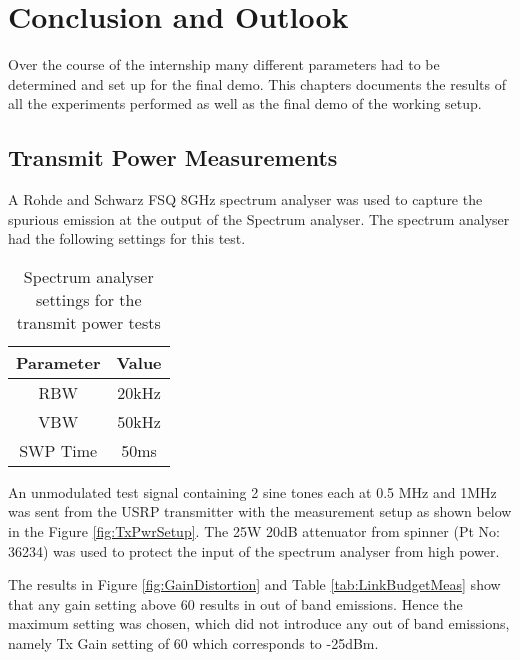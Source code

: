 \chapter{Conclusion and Outlook}
\label{ch:conOutlook}

Over the course of the internship many different parameters had to be determined and set up for the final demo. This chapters documents the results of all the experiments performed as well as the final demo of the working setup.

\section{Transmit Power Measurements}\label{GainDistortion}

A Rohde and Schwarz FSQ 8GHz spectrum analyser was used to capture the spurious emission at the output of the Spectrum analyser. The spectrum analyser had the following settings for this test.

\begin{table}[H]
    \begin{center}
        \begin{tabular}{|c|c|}
            \hline
            Parameter & Value \\ \hline
            RBW & 20kHz \\ \hline
            VBW & 50kHz \\ \hline
            SWP Time & 50ms  \\ 
            \hline
        \end{tabular}
    \end{center}
    \caption{Spectrum analyser settings for the transmit power tests}
    \label{}
\end{table}

An unmodulated test signal containing 2 sine tones each at 0.5 MHz and 1MHz was sent from the USRP transmitter with the measurement setup as shown below in the Figure \ref{fig:TxPwrSetup}. The 25W 20dB attenuator from spinner (Pt No: 36234) was used to protect the input of the spectrum analyser from high power.


The results in Figure \ref{fig:GainDistortion} and Table \ref{tab:LinkBudgetMeas} show that any gain setting above 60 results in out of band emissions. Hence the maximum setting was chosen, which did not introduce any out of band emissions, namely Tx Gain setting of 60 which corresponds to -25dBm.


